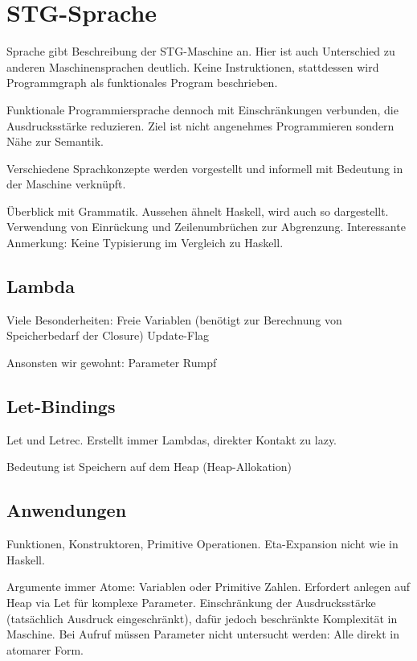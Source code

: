 
\chapter{STG-Sprache}

Sprache gibt Beschreibung der STG-Maschine an.
Hier ist auch Unterschied zu anderen Maschinensprachen deutlich.
Keine Instruktionen, stattdessen wird Programmgraph als funktionales Program beschrieben.

Funktionale Programmiersprache dennoch mit Einschränkungen verbunden, die Ausdrucksstärke reduzieren.
Ziel ist nicht angenehmes Programmieren sondern Nähe zur Semantik.

Verschiedene Sprachkonzepte werden vorgestellt und informell mit Bedeutung in der Maschine verknüpft.

Überblick mit Grammatik.
Aussehen ähnelt Haskell, wird auch so dargestellt.
Verwendung von Einrückung und Zeilenumbrüchen zur Abgrenzung.
Interessante Anmerkung: Keine Typisierung im Vergleich zu Haskell.



\section{Lambda}

Viele Besonderheiten:
Freie Variablen (benötigt zur Berechnung von Speicherbedarf der Closure)
Update-Flag

Ansonsten wir gewohnt:
Parameter
Rumpf


\section{Let-Bindings}

Let und Letrec.
Erstellt immer Lambdas, direkter Kontakt zu lazy.

Bedeutung ist Speichern auf dem Heap (Heap-Allokation)


\section{Anwendungen}

Funktionen, Konstruktoren, Primitive Operationen.
Eta-Expansion nicht wie in Haskell. %

Argumente immer Atome: Variablen oder Primitive Zahlen.
Erfordert anlegen auf Heap via Let für komplexe Parameter.
Einschränkung der Ausdrucksstärke (tatsächlich Ausdruck eingeschränkt), dafür jedoch beschränkte Komplexität in Maschine.
Bei Aufruf müssen Parameter nicht untersucht werden: Alle direkt in atomarer Form.


